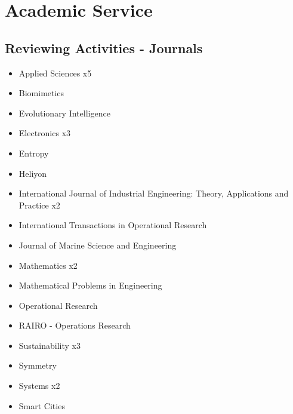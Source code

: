 \section{Academic Service}

\subsection{Reviewing Activities - Journals}

{\begin{itemize}
\item Applied Sciences x5
\item Biomimetics
\item Evolutionary Intelligence
\item Electronics x3
\item Entropy
\item Heliyon
\item International Journal of Industrial Engineering: Theory, Applications and Practice x2
\item International Transactions in Operational Research
\item Journal of Marine Science and Engineering
\item Mathematics x2
\item Mathematical Problems in Engineering
\item Operational Research
\item RAIRO - Operations Research
\item Sustainability x3
\item Symmetry
\item Systems x2
\item Smart Cities
\end{itemize}
}

